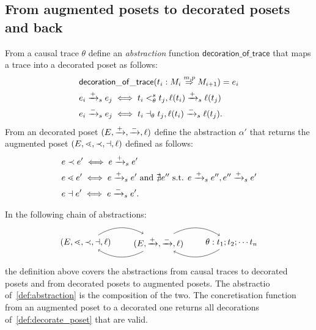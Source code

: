 \subsection{From augmented posets to decorated posets and back}
\label{sec:abstract_decoration}

\begin{definition}[Abstractions]
  From a causal trace $\theta$ define an \emph{abstraction} function $\mathsf{decoration\_of\_trace}$ that maps a trace into a decorated poset as follows:
  \begin{align*}
    &\mathsf{decoration\_of\_trace}(t_i:M_i\overset{m,p}{\Rightarrow} M_{i+1}) = e_i \\
    &e_i \mathrel{\xrightarrow{+}}_s e_j \iff t_i <_{\theta}^s t_j, \ell(t_i)\mathrel{\xrightarrow{+}}_s \ell(t_j)\\
    &e_i \mathrel{\xrightarrow{-}}_s e_j \iff t_i \dashv_{\theta} t_j, \ell(t_i) \mathrel{\xrightarrow{-}}_s \ell(t_j).
  \end{align*}
  From an decorated poset $(E,\mathrel{\xrightarrow{+}},\mathrel{\xrightarrow{-}},\ell)$ define the abstraction $\alpha'$ that returns the augmented poset $(E,\lessdot,\prec,\dashv,\ell)$ defined as follows:
  \begin{align*}
    &e\prec e'\iff e\mathrel{\xrightarrow{+}}_s e'\\
    &e\lessdot e'\iff e\mathrel{\xrightarrow{+}}_s e'\text{ and }\nexists e''\text{ s.t. }e\mathrel{\xrightarrow{+}}_s e'', e''\mathrel{\xrightarrow{+}}_s e'\\
    &e\dashv e'\iff e\mathrel{\xrightarrow{-}}_s e'.
  \end{align*}
\end{definition}

In the following chain of abstractions:
  \[
  \begin{tikzpicture} %
    \node (as) at (3,0) {\((E,\cover,\prec,\dashv,\labl)\)};
    \node (ds) at (6,0) {\((E,\redl{+},\redl{-},\labl)\)};
    \node (trace) at (9,0) {\(\theta:t_1;t_2;\cdots t_n\)};
    \draw [->] (ds) to [bend left] (as);
    \draw [->] (as) to [bend left] (ds);
    \draw [->] (ds) to [bend left] (trace);
    \draw [->] (trace) to [bend left] (ds);
  \end{tikzpicture}
  \]
the definition above covers the abstractions from causal traces to decorated posets and from decorated posets to augmented posets. The abstractio of~\autoref{def:abstraction} is the composition of the two. The concretisation function from an augmented poset to a decorated one returns all decorations of~\autoref{def:decorate_poset} that are valid.
